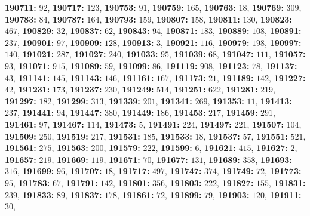 \textsf{\bfseries 190711:} $92$, \textsf{\bfseries 190717:} $123$, \textsf{\bfseries 190753:} $91$, \textsf{\bfseries 190759:} $165$, \textsf{\bfseries 190763:} $18$, \textsf{\bfseries 190769:} $309$, \textsf{\bfseries 190783:} $84$, \textsf{\bfseries 190787:} $164$, \textsf{\bfseries 190793:} $159$, \textsf{\bfseries 190807:} $158$, \textsf{\bfseries 190811:} $130$, \textsf{\bfseries 190823:} $467$, \textsf{\bfseries 190829:} $32$, \textsf{\bfseries 190837:} $62$, \textsf{\bfseries 190843:} $94$, \textsf{\bfseries 190871:} $183$, \textsf{\bfseries 190889:} $108$, \textsf{\bfseries 190891:} $237$, \textsf{\bfseries 190901:} $97$, \textsf{\bfseries 190909:} $128$, \textsf{\bfseries 190913:} $3$, \textsf{\bfseries 190921:} $116$, \textsf{\bfseries 190979:} $198$, \textsf{\bfseries 190997:} $140$, \textsf{\bfseries 191021:} $287$, \textsf{\bfseries 191027:} $240$, \textsf{\bfseries 191033:} $95$, \textsf{\bfseries 191039:} $68$, \textsf{\bfseries 191047:} $111$, \textsf{\bfseries 191057:} $93$, \textsf{\bfseries 191071:} $915$, \textsf{\bfseries 191089:} $59$, \textsf{\bfseries 191099:} $86$, \textsf{\bfseries 191119:} $908$, \textsf{\bfseries 191123:} $78$, \textsf{\bfseries 191137:} $43$, \textsf{\bfseries 191141:} $145$, \textsf{\bfseries 191143:} $146$, \textsf{\bfseries 191161:} $167$, \textsf{\bfseries 191173:} $21$, \textsf{\bfseries 191189:} $142$, \textsf{\bfseries 191227:} $42$, \textsf{\bfseries 191231:} $173$, \textsf{\bfseries 191237:} $230$, \textsf{\bfseries 191249:} $514$, \textsf{\bfseries 191251:} $622$, \textsf{\bfseries 191281:} $219$, \textsf{\bfseries 191297:} $182$, \textsf{\bfseries 191299:} $313$, \textsf{\bfseries 191339:} $201$, \textsf{\bfseries 191341:} $269$, \textsf{\bfseries 191353:} $11$, \textsf{\bfseries 191413:} $237$, \textsf{\bfseries 191441:} $94$, \textsf{\bfseries 191447:} $380$, \textsf{\bfseries 191449:} $186$, \textsf{\bfseries 191453:} $217$, \textsf{\bfseries 191459:} $291$, \textsf{\bfseries 191461:} $97$, \textsf{\bfseries 191467:} $114$, \textsf{\bfseries 191473:} $5$, \textsf{\bfseries 191491:} $224$, \textsf{\bfseries 191497:} $221$, \textsf{\bfseries 191507:} $104$, \textsf{\bfseries 191509:} $250$, \textsf{\bfseries 191519:} $217$, \textsf{\bfseries 191531:} $185$, \textsf{\bfseries 191533:} $18$, \textsf{\bfseries 191537:} $57$, \textsf{\bfseries 191551:} $521$, \textsf{\bfseries 191561:} $275$, \textsf{\bfseries 191563:} $200$, \textsf{\bfseries 191579:} $222$, \textsf{\bfseries 191599:} $6$, \textsf{\bfseries 191621:} $415$, \textsf{\bfseries 191627:} $2$, \textsf{\bfseries 191657:} $219$, \textsf{\bfseries 191669:} $119$, \textsf{\bfseries 191671:} $70$, \textsf{\bfseries 191677:} $131$, \textsf{\bfseries 191689:} $358$, \textsf{\bfseries 191693:} $316$, \textsf{\bfseries 191699:} $96$, \textsf{\bfseries 191707:} $18$, \textsf{\bfseries 191717:} $497$, \textsf{\bfseries 191747:} $374$, \textsf{\bfseries 191749:} $72$, \textsf{\bfseries 191773:} $95$, \textsf{\bfseries 191783:} $67$, \textsf{\bfseries 191791:} $142$, \textsf{\bfseries 191801:} $356$, \textsf{\bfseries 191803:} $222$, \textsf{\bfseries 191827:} $155$, \textsf{\bfseries 191831:} $239$, \textsf{\bfseries 191833:} $89$, \textsf{\bfseries 191837:} $178$, \textsf{\bfseries 191861:} $72$, \textsf{\bfseries 191899:} $79$, \textsf{\bfseries 191903:} $120$, \textsf{\bfseries 191911:} $30$, 
